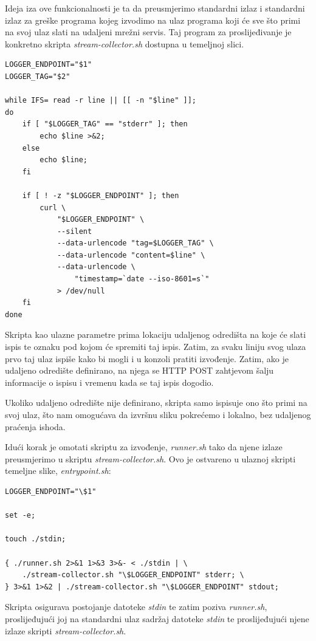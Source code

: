\documentclass[times, utf8, zavrsni]{fer}
\begin{document}
Ideja iza ove funkcionalnosti je ta da preusmjerimo standardni izlaz i standardni izlaz za greške programa kojeg izvodimo na ulaz programa koji će sve što primi na svoj ulaz slati na udaljeni mrežni servis. Taj program za proslijeđivanje je konkretno skripta {\textit{stream-collector.sh}} dostupna u temeljnoj slici.

\begin{lstlisting}
LOGGER_ENDPOINT="$1"
LOGGER_TAG="$2"

while IFS= read -r line || [[ -n "$line" ]];
do
	if [ "$LOGGER_TAG" == "stderr" ]; then
		echo $line >&2;
	else
		echo $line;
	fi

	if [ ! -z "$LOGGER_ENDPOINT" ]; then
		curl \
			"$LOGGER_ENDPOINT" \
			--silent
			--data-urlencode "tag=$LOGGER_TAG" \
			--data-urlencode "content=$line" \
			--data-urlencode \
				"timestamp=`date --iso-8601=s`"
			> /dev/null
	fi
done
\end{lstlisting}

Skripta kao ulazne parametre prima lokaciju udaljenog odredišta na koje će slati ispis te oznaku pod kojom će spremiti taj ispis. Zatim, za svaku liniju svog ulaza prvo taj ulaz ispiše kako bi mogli i u konzoli pratiti izvođenje. Zatim, ako je udaljeno odredište definirano, na njega se HTTP POST zahtjevom šalju informacije o ispisu i vremenu kada se taj ispis dogodio.

Ukoliko udaljeno odredište nije definirano, skripta samo ispisuje ono što primi na svoj ulaz, što nam omogućava da izvršnu sliku pokrećemo i lokalno, bez udaljenog praćenja ishoda.

Idući korak je omotati skriptu za izvođenje, {\textit{runner.sh}} tako da njene izlaze preusmjerimo u skriptu {\textit{stream-collector.sh}}. Ovo je ostvareno u ulaznoj skripti temeljne slike, {\textit{entrypoint.sh}}:

\begin{lstlisting}
LOGGER_ENDPOINT="\$1"

set -e;

touch ./stdin;

{ ./runner.sh 2>&1 1>&3 3>&- < ./stdin | \
	./stream-collector.sh "\$LOGGER_ENDPOINT" stderr; \
} 3>&1 1>&2 | ./stream-collector.sh "\$LOGGER_ENDPOINT" stdout;
\end{lstlisting}

Skripta osigurava postojanje datoteke {\textit{stdin}} te zatim poziva {\textit{runner.sh}}, proslijeđujući joj na standardni ulaz sadržaj datoteke {\textit{stdin}} te proslijeđujući njene izlaze skripti {\textit{stream-collector.sh}}.
\end{document}
